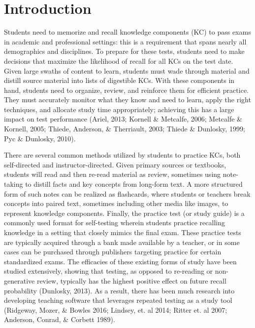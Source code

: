 \documentclass[a4paper,12pt]{article}
\begin{document}
\section{Introduction}
Students need to memorize and recall knowledge components (KC) to pass exams in academic and professional settings: this is a requirement that spans nearly all demographics and disciplines. To prepare for these tests, students need to make decisions that maximize the likelihood of recall for all KCs on the test date. Given large swaths of content to learn, students must wade through material and distill source material into lists of digestible KCs. With these components in hand, students need to organize, review, and reinforce them for efficient practice. They must accurately monitor what they know and need to learn, apply the right techniques, and allocate study time appropriately; achieving this has a large impact on test performance  (Ariel, 2013; Kornell \& Metcalfe, 2006; Metcalfe \& Kornell, 2005; Thiede, Anderson, \& Therriault, 2003; Thiede \& Dunlosky, 1999; Pyc \& Dunlosky, 2010).

There are several common methods utilized by students to practice KCs, both self-directed and instructor-directed. Given primary sources or textbooks, students will read and then re-read material as review, sometimes using note-taking to distill facts and key concepts from long-form text. A more structured form of such notes can be realized as flashcards, where students or teachers break concepts into paired text, sometimes including other media like images, to represent knowledge components. Finally, the practice test (or study guide) is a commonly used format for self-testing wherein students practice recalling knowledge in a setting that closely mimics the final exam. These practice tests are typically acquired through a bank made available by a teacher, or in some cases can be purchased through publishers targeting practice for certain standardized exams. The efficacies of these existing forms of study have been studied extensively, showing that testing, as opposed to re-reading or non-generative review, typically has the highest positive effect on future recall probability (Dunlosky, 2013). As a result, there has been much research into developing teaching software that leverages repeated testing as a study tool (Ridgeway, Mozer, \& Bowles 2016; Lindsey, et. al 2014; Ritter et. al 2007; Anderson, Conrad, \& Corbett 1989).
\end{document}
